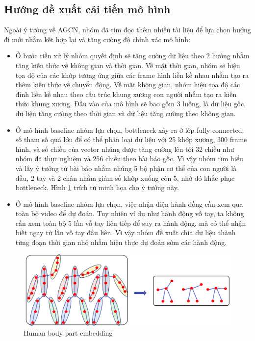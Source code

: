 \subsection{Hướng đề xuất cải tiến mô hình}

Ngoài ý tưởng về AGCN, nhóm đã tìm đọc thêm nhiều tài liệu để lựa chọn hướng đi mới nhằm kết hợp lại và tăng cường độ chính xác mô hình:

\begin{itemize}
    \item Ở bước tiền xử lý nhóm quyết định sẽ tăng cường dữ liệu theo 2 hướng nhằm tăng kiến thức về không gian và thời gian. Về mặt thời gian, nhóm sẽ hiệu tọa độ của các khớp tương ứng giữa các frame hình liền kề nhau nhằm tạo ra thêm kiến thức về chuyển động. Về mặt không gian, nhóm hiệu tọa độ các đỉnh liền kề nhau theo cấu trúc khung xương con người nhằm tạo ra kiến thức khung xương. Đầu vào của mô hình sẽ bao gồm 3 luồng, là dữ liệu gốc, dữ liệu tăng cường theo thời gian và dữ liệu tăng cường theo không gian.
    \item Ở mô hình baseline nhóm lựa chọn, bottleneck xảy ra ở lớp fully connected, số tham số quá lớn để có thể phân loại dữ liệu với 25 khớp xương, 300 frame hình, và số chiều của vector nhúng được tăng cường lên tới 32 chiều như nhóm đã thực nghiệm và 256 chiều theo bài báo gốc. Vì vậy nhóm tìm hiểu và lấy ý tưởng từ bài báo \cite{song2020stronger} nhằm nhúng 5 bộ phận cơ thể của con người là đầu, 2 tay và 2 chân nhằm giảm số khớp xuống còn 5, nhờ đó khắc phục bottleneck. Hình \ref{fig:body-part-embedding} trích từ \cite{song2020stronger} minh họa cho ý tưởng này.
    \item Ở mô hình baseline nhóm lựa chọn, việc nhận diện hành đồng cần xem qua toàn bộ video để dự đoán. Tuy nhiên ví dụ như hành động vỗ tay, ta không cần xem toàn bộ 5 lần vỗ tay liên tiếp để suy ra hành động, mà có thể nhận biết ngay từ lần vỗ tay đầu liên. Vì vậy nhóm đề xuất chia dữ liệu thành từng đoạn thời gian nhỏ nhằm hiện thực dự đoán sớm các hành động.
\end{itemize}

\begin{figure}[!ht]
    \begin{center}
        \includegraphics[width=\linewidth]{asset/image/body_part_embedding.png}
        \caption{Human body part embedding}
        \label{fig:body-part-embedding}
    \end{center}
\end{figure}
